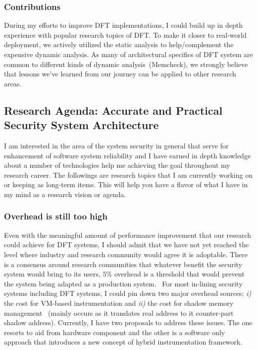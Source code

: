 \documentclass[letterpaper, 10pt]{article}
\begin{document}
\begin{small}
\subsubsection*{Contributions}
During my efforts to improve DFT implementations, I could build up in depth
experience with popular research topics of DFT. 
%
To make it closer to real-world deployment, we actively utilized the static
analysis to help/complement the expensive dynamic analysis. 
%
As many of architectural specifics of DFT system are common to different kinds
of dynamic analysis~(\ie Memcheck), we strongly believe that lessons we've
learned from our journey can be applied to other research areas.
 
\subsection*{Research Agenda: Accurate and Practical Security System
Architecture} 
%
I am interested in the area of the system security in general that serve for
enhancement of software system reliability and I have earned in depth knowledge
about a number of technologies help me achieving the goal throughout my
research career. 
%
The followings are research topics that I am currently working on or keeping as
long-term items. This will help you have a flavor of what I have in my mind as
a research vision or agenda. 
%
\subsubsection*{Overhead is still too high} 
%
Even with the meaningful amount of performance improvement that our research
could achieve for DFT systems, I should admit that we have not yet reached the
level where industry and research community would agree it is adoptable. 
There is a consensus around research communities that whatever benefit the
security system would bring to its users, $5\%$ overhead is a threshold that
would prevent the system being adapted as a production
system.~\cite{ccs2013:invited_talk}
%
For most in-lining security systems including DFT systems, I could pin down two
major overhead sources; {\it i)} the cost for VM-based instrumentation and {\it
ii)} the cost for shadow memory management ~(mainly occurs as it translates
real address to it counter-part shadow address).
%
Currently, I have two proposals to address these issues. The one resorts to aid
from hardware component and the other is a software only approach that
introduces a new concept of hybrid instrumentation framework. 


\end{small}
\end{document}
